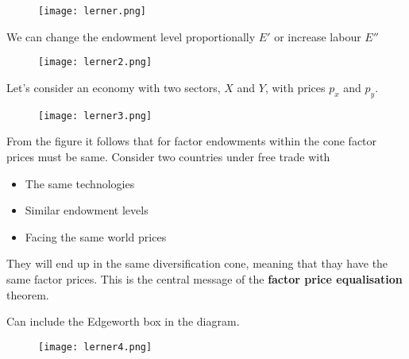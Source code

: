 \documentclass{beamer}
\begin{document}
\begin{frame}
  \begin{figure}
    \texttt{[image: lerner.png]}
  \end{figure}
\end{frame}

\begin{frame}
We can change the endowment level proportionally $E'$ or increase labour $E''$
  \begin{figure}
    \texttt{[image: lerner2.png]}    
  \end{figure}
\end{frame}

\begin{frame}
Let's consider an economy with two sectors, $X$ and $Y$, with prices $p_x$ and $p_y$.
  \begin{figure}
    \texttt{[image: lerner3.png]}
  \end{figure}
\end{frame}

\begin{frame}
 From the figure it follows that for factor endowments within the cone factor prices must be same.
 Consider two countries under free trade with
 \begin{itemize}
   \item The same technologies
   \item Similar endowment levels
   \item Facing the same world prices
 \end{itemize}
They will end up in the same diversification cone, meaning that thay have the same factor prices.
This is the central message of the \textbf{factor price equalisation} theorem. 
\end{frame}

\begin{frame}
  Can include the Edgeworth box in the diagram.
  \begin{figure}
    \texttt{[image: lerner4.png]}
  \end{figure}
\end{frame}
\end{document}
